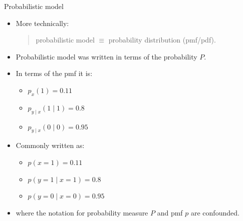 \documentclass{beamer}
\begin{document}
\begin{frame}{Probabilistic model}
\begin{itemize}
  \item More technically:
  \begin{quote}
    probabilistic model $\equiv$ probability distribution (pmf/pdf).
  \end{quote}
  \item Probabilistic model was written in terms of the probability $P$.
  \item In terms of the pmf it is:
  \begin{itemize}
    \item $p_x(1) = 0.11$
    \item $p_{y \mid x}(1 \mid 1) = 0.8$
    \item $p_{y \mid x}(0 \mid 0) = 0.95$
  \end{itemize}
  \item Commonly written as:
  \begin{itemize}
    \item $p(x = 1) = 0.11$
    \item $p(y = 1 \mid x = 1) = 0.8$
    \item $p(y = 0 \mid x = 0) = 0.95$
  \end{itemize}
  \item where the notation for probability measure $P$ and pmf $p$ are confounded.
\end{itemize}
\end{frame}
\end{document}
